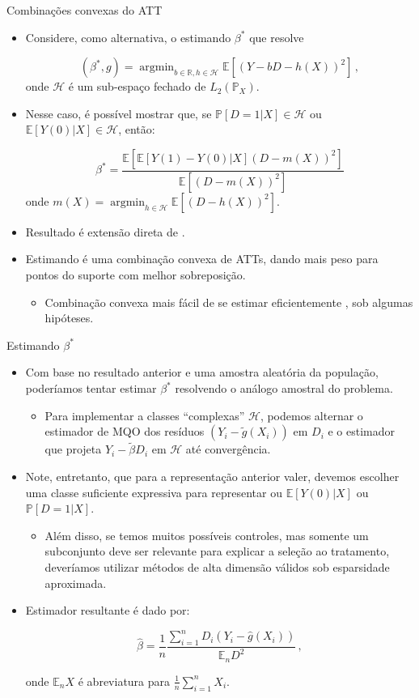 \documentclass[11pt]{beamer}
\begin{document}
	\begin{frame}{Combinações convexas do ATT}
		\begin{itemize}
			\item Considere, como alternativa, o estimando $\beta^*$ que resolve
			
			$$(\beta^*,g) = \operatorname{argmin}_{{b\in \mathbb{R}, h \in \mathcal{H}}} \mathbb{E}[(Y-bD - h(X))^2]\, ,$$
			onde $\mathcal{H}$ é um sub-espaço fechado de $L_2(\mathbb{P}_X)$.
			\item Nesse caso, é possível mostrar que, {\color{blue}se $\mathbb{P}[D=1|X]\in \mathcal{H}$ ou $\mathbb{E}[Y(0)|X] \in \mathcal{H}$}, então:
			
			$$\beta^* = \frac{\mathbb{E}[\mathbb{E}[Y(1)-Y(0)|X](D-m(X))^2 ]}{\mathbb{E}[(D-m(X))^2]}$$
			onde $m(X) = \operatorname{argmin}_{h \in \mathcal{H}} \mathbb{E}[(D-h(X))^2]$.
			\item Resultado é extensão direta de \citet{Angrist1998}.
			\item Estimando é uma combinação convexa de ATTs, dando mais peso para pontos do suporte com melhor sobreposição.
			\begin{itemize}
				\item Combinação convexa mais fácil de se estimar eficientemente \citep{contaminationbias}, sob algumas hipóteses.
			\end{itemize}
		\end{itemize}
	\end{frame}
	
	\begin{frame}{Estimando $\beta^*$}
		\begin{itemize}
			\item Com base no resultado anterior e uma amostra aleatória da população, poderíamos tentar estimar $\beta^*$ resolvendo o análogo amostral do problema.
			\begin{itemize}
				\item Para implementar a classes ``complexas'' $\mathcal{H}$, podemos alternar o estimador de MQO dos resíduos $(Y_i-\tilde{g}(X_i))$ em $D_i$ e o estimador que projeta $Y_i - \tilde{\beta} D_i$ em $\mathcal{H}$ até convergência.
			\end{itemize} 
			\item Note, entretanto, que para a representação anterior valer, devemos escolher uma classe suficiente expressiva para representar ou $\mathbb{E}[Y(0)|X]$ ou $\mathbb{P}[D=1|X]$.
			\begin{itemize}
				\item Além disso, se temos muitos possíveis controles, mas somente um subconjunto deve ser relevante para explicar a seleção ao tratamento, deveríamos utilizar métodos de alta dimensão válidos sob esparsidade aproximada. 
			\end{itemize}
			\item Estimador resultante é dado por:
			
			$$\hat{\beta} =\frac{1}{n} \frac{  \sum_{i=1}^nD_i (Y_i - \hat{g}(X_i))}{\mathbb{E}_n D^2}\, ,$$
				
				onde $\mathbb{E}_n X$ é  abreviatura para $\frac{1}{n}\sum_{i=1}^n X_i$.
		\end{itemize}
	\end{frame}
	
\end{document}
